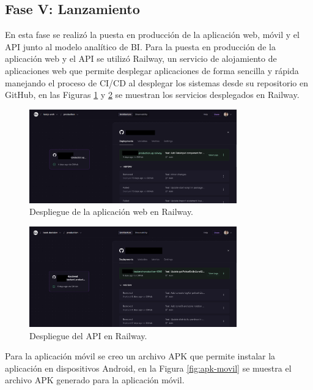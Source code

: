 \subsection{Fase V: Lanzamiento}
En esta fase se realizó la puesta en producción de la aplicación web, móvil y el API junto al modelo analítico
de BI. Para la puesta en producción de la aplicación web y el API se utilizó Railway, un servicio de alojamiento de aplicaciones web que permite
desplegar aplicaciones de forma sencilla y rápida manejando el proceso de CI/CD al desplegar los sistemas desde su repositorio en GitHub, en las
Figuras \ref{fig:despliegue-web} y \ref{fig:despliegue-api} se muestran los servicios desplegados en Railway.

\begin{figure}[H]
    \centering
    \includegraphics[width=0.8\textwidth]{chapters/III-resultados-y-discusion/resources/images/despliegue-web.png}
    \caption{Despliegue de la aplicación web en Railway.}
    \label{fig:despliegue-web}
\end{figure}

\begin{figure}[H]
    \centering
    \includegraphics[width=0.8\textwidth]{chapters/III-resultados-y-discusion/resources/images/despliegue-api.png}
    \caption{Despliegue del API en Railway.}
    \label{fig:despliegue-api}
\end{figure}

Para la aplicación móvil se creo un archivo APK que permite instalar la aplicación en dispositivos Android, en la Figura \ref{fig:apk-movil}
se muestra el archivo APK generado para la aplicación móvil.

